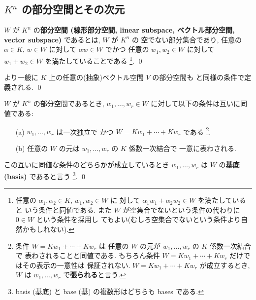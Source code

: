 \documentclass[12pt,twoside]{jarticle}
\begin{document}

\subsection{$K^n$ の部分空間とその次元}
\label{sec:subsp}


\begin{definition}[$K^n$ の部分空間]
  \label{def:subsp}
  $W$ が $K^n$ の{\bf 部分空間 (線形部分空間, linear subspace, 
  ベクトル部分空間, vector subspace)} であるとは, $W$ が $K^n$ の
  空でない部分集合であり, 
  任意の $\alpha\in K$, $w\in W$ に対して $\alpha w\in W$ でかつ
  任意の $w_1,w_2\in W$ に対して $w_1+w_2\in W$ を満たしていることである%
  \footnote{任意の $\alpha_1,\alpha_2\in K$, $w_1,w_2\in W$ に
    対して $\alpha_1w_1+\alpha_2w_2\in W$ を満たしていると
    いう条件と同値である.
    また $W$ が空集合でないという条件の代わりに $0\in W$ という条件を採用し
    てもよい(むしろ空集合でないという条件より自然かもしれない).}.
  \qed
\end{definition}

\begin{guide}
  より一般に $K$ 上の任意の(抽象)ベクトル空間 $V$ の部分空間も
  と同様の条件で定義される.
  \qed
\end{guide}


\begin{question}[基底]
  $W$ が $K^n$ の部分空間であるとき, 
  $w_1,\ldots,w_r\in W$ に対して以下の条件は互いに同値である:
  \begin{enumerate}
  \item[(a)] $w_1,\ldots,w_r$ は一次独立で
    かつ $W = Kw_1+\cdots+Kw_r$ である%
    \footnote{条件 $W = Kw_1+\cdots+Kw_r$ は
      任意の $W$ の元が $w_1,\ldots,w_r$ の $K$ 係数一次結合で
      表わされることと同値である.
      もちろん条件 $W = Kw_1+\cdots+Kw_r$ だけではその表示の一意性は
      保証されない.
      $W = Kw_1+\cdots+Kw_r$ が成立するとき, $W$ は $w_1,\ldots,w_r$ 
      で{\bf 張られる}と言う.}.
  \item[(b)] 任意の $W$ の元は $w_1,\ldots,w_r$ の $K$ 係数一次結合で
    一意に表わされる.
  \end{enumerate}
  この互いに同値な条件のどちらかが成立しているとき $w_1,\ldots,w_r$ 
  は $W$ の{\bf 基底 (basis)} であると言う%
  \footnote{basis (基底) と base (基) の複数形はどちらも bases である.}.
  \qed
\end{question}
\end{document}
